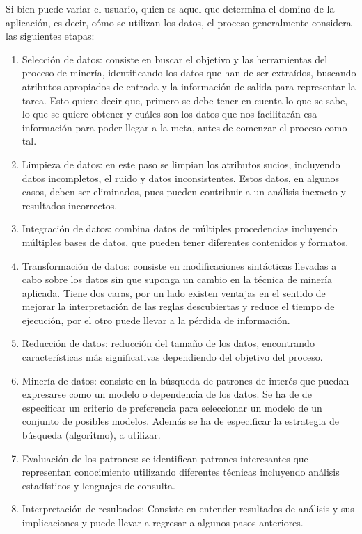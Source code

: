 Si bien puede variar el usuario, quien es aquel que determina el domino de la aplicación, es decir, cómo se utilizan los datos, el proceso generalmente considera las siguientes etapas:

\begin{enumerate}
\item Selección de datos: consiste en buscar el objetivo y las herramientas del proceso de minería, identificando los datos que han de ser extraídos, buscando atributos apropiados de entrada y la información de salida para representar la tarea. Esto quiere decir que, primero se debe tener en cuenta lo que se sabe, lo que se quiere obtener y cuáles son los datos que nos facilitarán esa información para poder llegar a la meta, antes de comenzar el proceso como tal.
\item Limpieza de datos: en este paso se limpian los atributos sucios, incluyendo datos incompletos, el ruido y datos inconsistentes. Estos datos, en algunos casos, deben ser eliminados, pues pueden contribuir a un análisis inexacto y resultados incorrectos.
\item Integración de datos:  combina datos de múltiples procedencias incluyendo múltiples bases de datos, que pueden tener diferentes contenidos y formatos.
\item Transformación de datos: consiste en modificaciones sintácticas llevadas a cabo sobre los datos sin que suponga un cambio en la técnica de minería aplicada. Tiene dos caras, por un lado existen ventajas en el sentido de mejorar la interpretación de las reglas descubiertas y reduce el tiempo de ejecución, por el otro puede llevar a la pérdida de información.
\item Reducción de datos: reducción del tamaño de los datos, encontrando características más significativas dependiendo del objetivo del proceso.
\item Minería de datos: consiste en la búsqueda de patrones de interés que puedan expresarse como un modelo o dependencia de los datos. Se ha de de especificar un criterio de preferencia para seleccionar un modelo de un conjunto de posibles modelos. Además se ha de especificar la estrategia de búsqueda (algoritmo), a utilizar.
\item Evaluación de los patrones: se identifican patrones interesantes que representan conocimiento utilizando diferentes técnicas incluyendo análisis estadísticos y lenguajes de consulta.
\item Interpretación de resultados: Consiste en entender resultados de análisis y sus implicaciones y puede llevar a regresar a algunos pasos anteriores.
\end{enumerate}

